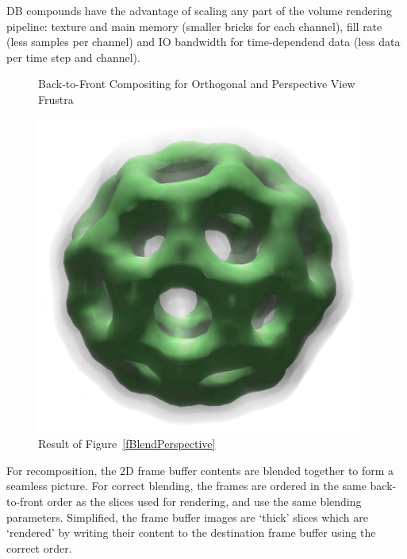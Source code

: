 \documentclass[10pt,a4]{scrartcl}
\newcommand{\fig}[1]{Figure~\ref{#1}}
\begin{document}
DB compounds have the advantage of scaling any part of the volume
rendering pipeline: texture and main memory (smaller bricks for each
channel), fill rate (less samples per channel) and IO bandwidth for
time-dependend data (less data per time step and channel).

\begin{figure}[h!t]
  \hfil
  {\caption{\small\label{fBlend}Back-to-Front Com\-po\-siting for
      Orthogonal and Perspective View Frustra}}
\end{figure}
\begin{figure}
  \includegraphics[width=.4\textwidth]{images/volResult.png}
  {\caption{\small\label{fVolResult}Result of \fig{fBlendPerspective}}}
\end{figure}
For recomposition, the 2D frame buffer contents are blended together to
form a seamless picture. For correct blending, the frames are ordered in
the same back-to-front order as the slices used for rendering, and use the
same blending parameters. Simplified, the frame buffer images are
`thick' slices which are `rendered' by writing their content to the
destination frame buffer using the correct order. 
\end{document}
